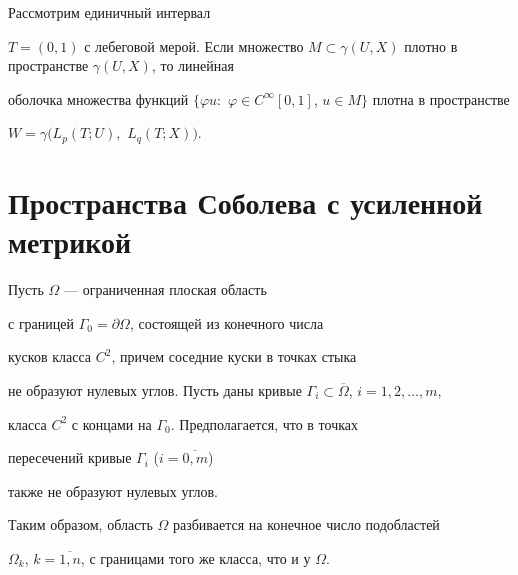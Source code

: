 \begin{cornonum}


Рассмотрим единичный интервал


$T=(0,1)$ с лебеговой мерой. Если множество $M \subset


\gamma(U,X)$ плотно в пространстве $\gamma(U,X)$, то линейная


оболочка множества функций $\{\varphi u:$ $ \varphi \in


C^{\infty}[0,1]$, $u \in M\}$ плотна в пространстве


$W=\gamma(L_p(T;U),$ $ L_q(T;X))$. 


\end{cornonum}








\section{Пространства Соболева с усиленной метрикой}





Пусть $\Omega$ --- ограниченная плоская область 


с границей $\Gamma_0=\partial \Omega$, состоящей из конечного числа 


кусков класса $C^2$, причем соседние куски в точках стыка


не образуют нулевых углов. Пусть даны кривые $\Gamma_i \subset


\overline{\Omega}$, $i=1,2,\dotsc,m$,


класса $C^2$ с концами на $\Gamma_0$. Предполагается, что в точках


пересечений кривые $\Gamma_i$ ($i=\overline{0,m}$)


также не образуют нулевых углов.


Таким образом, область $\Omega$ разбивается на конечное число подобластей


$\Omega_k$, $k=\overline{1,n}$, с границами того же класса, что и у $\Omega$.





